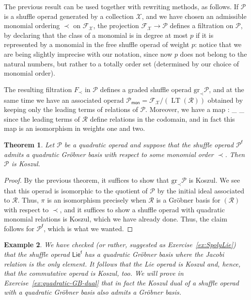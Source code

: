 \documentclass[fleqn, a4paper, twoside]{article}
\makeatletter
\newcommand{\lead}[1]{\operatorname{LT}(#1)}
\newcommand{\0}{\langle 0\rangle}
\newcommand{\XX}{\mathcal{X}}
\newcommand{\RR}{\mathcal{R}}
\newcommand{\FF}{\mathcal{F}}
\newcommand{\f}{\mathsf{f}}
\let\[\@undefined
\DeclareRobustCommand{\[}{\begin{equation}}%
\let\]\@undefined
\DeclareRobustCommand{\]}{\end{equation}}%
\theoremstyle{mytheorem}
\newtheorem{theorem}{Theorem}[section]
\theoremstyle{introthm}
\theoremstyle{mydefinition}
\newtheorem{example}[theorem]{Example}
\theoremstyle{mydefinition2}
\theoremstyle{plain} %
\newcommand{\?}{\,?\,}
\newcommand{\PP}{{\mathcal{P}}}
\theoremstyle{mytheorem}
\theoremstyle{plain} %
\makeatother
\begin{document}
 The previous result can be used together with
 rewriting methods, as follows. If $\PP$ is
 a shuffle operad generated by a collection
 $\XX$, and we have chosen an admissible 
 monomial ordering $\prec $
 on $\FF_\XX$, the projection
 $\FF_\XX\longrightarrow \PP$ defines a filtration
 on $\PP$, by declaring that the class of a 
 monomial is in degree at most $p$ if it
 is represented by a monomial in the free shuffle
 operad of weight $p$: notice that we are being
 slightly imprecise with our notation, since now
 $p$ does not belong to the natural numbers,
 but rather to a totally order set (determined by
 our choice of monomial order).
 
 The resulting filtration $F_\prec$ in $\PP$
 defines a graded shuffle operad $\mathrm{gr}_\prec
 \PP$, and at the same time we have an associated
 operad $\PP_{\mathsf{mon}} = \FF_\XX / (\lead{\RR})$
 obtained by keeping only the leading terms
 of relations of $\PP$. Moreover, we have a map
 \[
 \pi : \PP_{} 
  	\longrightarrow 
  	_\prec \PP
 \]
 since the leading terms of $\RR$ define
 relations in the codomain, and in fact this
 map is an isomorphism in weights one and two.
 
 \begin{theorem}
 Let $\PP$ be a quadratic operad and suppose
 that the shuffle operad $\PP^\f$ admits a
 quadratic Gr\"obner basis with respect to some
 monomial order $\prec$. Then $\PP$ is
 Koszul. 
 \end{theorem}
 
 \begin{proof}
 By the previous theorem, it suffices to show
 that $\mathrm{gr}_\prec \PP$ is Koszul. We
 see that this operad is isomorphic to the
 quotient of $\PP$ by the initial ideal associated
 to $\RR$. Thus, $\pi$ is an isomorphism 
 precisely when $\RR$ is a Gr\"obner basis
 for $(\RR)$ with respect to $\prec$, and
 it suffices to show
 a shuffle operad with quadratic monomial
 relations is Koszul, which we have
 already done. Thus,
 the claim follows for
 $\PP^\f$, which is what we wanted. 
 \end{proof}
 

\begin{example}
We have checked (or rather, suggested as Exercise~\ref{ex:SpolyLie})
that the shuffle operad $\mathsf{Lie}^\f$ has a quadratic Gr\"obner
basis where the Jacobi relation is the only element. It follows
that the Lie operad is Koszul and, hence, that the commutative
operad is Koszul, too. We will prove in Exercise~\ref{ex:quadratic-GB-dual} that in fact the Koszul dual of a shuffle operad with
a quadratic Gr\"obner basis also admits a Gr\"obner basis.
\end{example}
\end{document}
